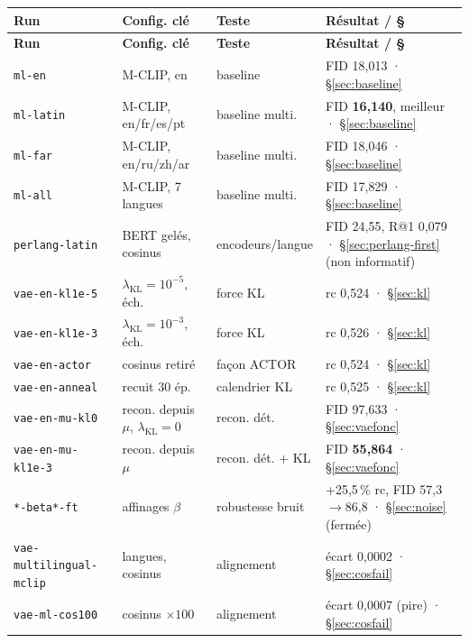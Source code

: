 \documentclass[12pt,a4paper,oneside]{report}
\theoremstyle{definition}
\theoremstyle{plain}
\newcommand{\lkl}{\ensuremath{\lambda_{\mathrm{KL}}}}
\renewcommand{\arraystretch}{1.15}
\begin{document}
\begingroup
\scriptsize
\setlength{\tabcolsep}{4pt}
\renewcommand{\arraystretch}{1.2}
\begin{longtable}{@{}>{\raggedright\arraybackslash}p{3.0cm}%
 >{\raggedright\arraybackslash}p{3.1cm}%
 >{\raggedright\arraybackslash}p{2.6cm}%
 >{\raggedright\arraybackslash}p{4.1cm}@{}}
\toprule
\textbf{Run} & \textbf{Config. clé} & \textbf{Teste} & \textbf{Résultat / \S} \\
\midrule
\endfirsthead
\toprule
\textbf{Run} & \textbf{Config. clé} & \textbf{Teste} & \textbf{Résultat / \S} \\
\midrule
\endhead
\bottomrule
\endfoot
\texttt{ml-en} & M-CLIP, en & baseline & FID 18,013 · \S\ref{sec:baseline} \\
\texttt{ml-latin} & M-CLIP, en/fr/es/pt & baseline multi. & FID \textbf{16,140}, meilleur · \S\ref{sec:baseline} \\
\texttt{ml-far} & M-CLIP, en/ru/zh/ar & baseline multi. & FID 18,046 · \S\ref{sec:baseline} \\
\texttt{ml-all} & M-CLIP, 7 langues & baseline multi. & FID 17,829 · \S\ref{sec:baseline} \\
\texttt{perlang-latin} & 4 BERT gelés, cosinus & encodeurs/langue & FID 24,55, R@1 0,079 · \S\ref{sec:perlang-first} (non informatif) \\
\texttt{vae-en-kl1e-5} & $\lkl{=}10^{-5}$, éch. & force KL & rc 0,524 · \S\ref{sec:kl} \\
\texttt{vae-en-kl1e-3} & $\lkl{=}10^{-3}$, éch. & force KL & rc 0,526 · \S\ref{sec:kl} \\
\texttt{vae-en-actor} & cosinus retiré & façon ACTOR & rc 0,524 · \S\ref{sec:kl} \\
\texttt{vae-en-anneal} & recuit 30 ép. & calendrier KL & rc 0,525 · \S\ref{sec:kl} \\
\texttt{vae-en-mu-kl0} & recon. depuis $\mu$, $\lkl{=}0$ & recon. dét. & FID 97,633 · \S\ref{sec:vaefonc} \\
\texttt{vae-en-mu-kl1e-3} & recon. depuis $\mu$ & recon. dét. + KL & FID \textbf{55,864} · \S\ref{sec:vaefonc} \\
\texttt{*-beta*-ft} & affinages $\beta$ & robustesse bruit & +25,5\,\% rc, FID 57,3$\to$86,8 · \S\ref{sec:noise} (fermée) \\
\texttt{vae-multilingual-mclip} & 7 langues, cosinus & alignement & écart 0,0002 · \S\ref{sec:cosfail} \\
\texttt{vae-ml-cos100} & cosinus $\times100$ & alignement & écart 0,0007 (pire) · \S\ref{sec:cosfail} \\

\end{longtable}
\end{document}
